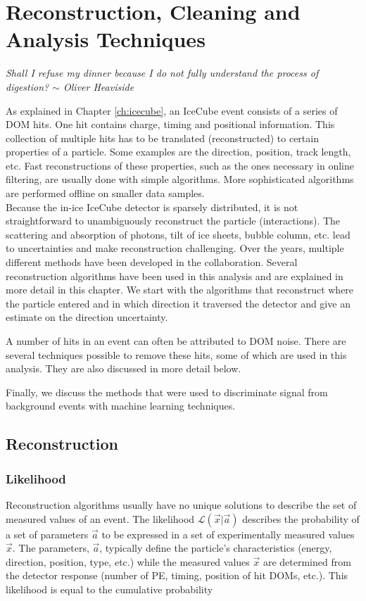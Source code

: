 \chapter{Reconstruction, Cleaning and Analysis Techniques}
\label{ch:reconstruction}
\begin{flushright}
\textit{Shall I refuse my dinner because I do not fully understand the process of digestion? $\sim$ Oliver Heaviside}
\end{flushright}
As explained in Chapter \ref{ch:icecube}, an IceCube event consists of a series of DOM hits. One hit contains charge, timing and positional information. This collection of multiple hits has to be translated (reconstructed) to certain properties of a particle. Some examples are the direction, position, track length, etc. Fast reconstructions of these properties, such as the ones necessary in online filtering, are usually done with simple algorithms. More sophisticated algorithms are performed offline on smaller data samples.\\

\noindent Because the in-ice IceCube detector is sparsely distributed, it is not straightforward to unambiguously reconstruct the particle (interactions). The scattering and absorption of photons, tilt of ice sheets, bubble column, etc. lead to uncertainties and make reconstruction challenging. Over the years, multiple different methods have been developed in the collaboration. Several reconstruction algorithms have been used in this analysis and are explained in more detail in this chapter. We start with the algorithms that reconstruct where the particle entered and in which direction it traversed the detector and give an estimate on the direction uncertainty.

A number of hits in an event can often be attributed to DOM noise. There are several techniques possible to remove these hits, some of which are used in this analysis. They are also discussed in more detail below.

Finally, we discuss the methods that were used to discriminate signal from background events with machine learning techniques.

\section{Reconstruction}

\subsection{Likelihood}
Reconstruction algorithms usually have no unique solutions to describe the set of measured values of an event. The likelihood $\mathcal{L}(\vec{x} |\vec{a})$ describes the probability of a set of parameters ${\vec{a}}$ to be expressed in a set of experimentally measured values ${\vec{x}}$. The parameters, ${\vec{a}}$, typically define the particle's characteristics (energy, direction, position, type, etc.) while the measured values ${\vec{x}}$ are determined from the detector response (number of PE, timing, position of hit DOMs, etc.). This likelihood is equal to the cumulative probability

